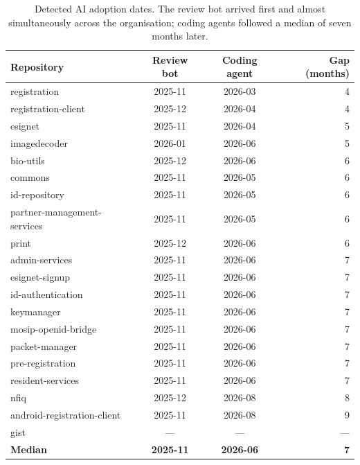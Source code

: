\begin{table}[htbp]
\centering
\caption{Detected AI adoption dates. The review bot arrived first and almost
simultaneously across the organisation; coding agents followed a median of
seven months later.}
\label{tab:adoption}
\small
\begin{tabular}{@{}lccr@{}}
\toprule
Repository & Review bot & Coding agent & Gap (months) \\
\midrule
registration                & 2025-11 & 2026-03 & 4 \\
registration-client         & 2025-12 & 2026-04 & 4 \\
esignet                     & 2025-11 & 2026-04 & 5 \\
imagedecoder                & 2026-01 & 2026-06 & 5 \\
bio-utils                   & 2025-12 & 2026-06 & 6 \\
commons                     & 2025-11 & 2026-05 & 6 \\
id-repository               & 2025-11 & 2026-05 & 6 \\
partner-management-services & 2025-11 & 2026-05 & 6 \\
print                       & 2025-12 & 2026-06 & 6 \\
admin-services              & 2025-11 & 2026-06 & 7 \\
esignet-signup              & 2025-11 & 2026-06 & 7 \\
id-authentication           & 2025-11 & 2026-06 & 7 \\
keymanager                  & 2025-11 & 2026-06 & 7 \\
mosip-openid-bridge         & 2025-11 & 2026-06 & 7 \\
packet-manager              & 2025-11 & 2026-06 & 7 \\
pre-registration            & 2025-11 & 2026-06 & 7 \\
resident-services           & 2025-11 & 2026-06 & 7 \\
nfiq                        & 2025-12 & 2026-08 & 8 \\
android-registration-client & 2025-11 & 2026-08 & 9 \\
gist                        & ---     & ---     & --- \\
\midrule
\textbf{Median}             & \textbf{2025-11} & \textbf{2026-06} & \textbf{7} \\
\bottomrule
\end{tabular}
\end{table}
